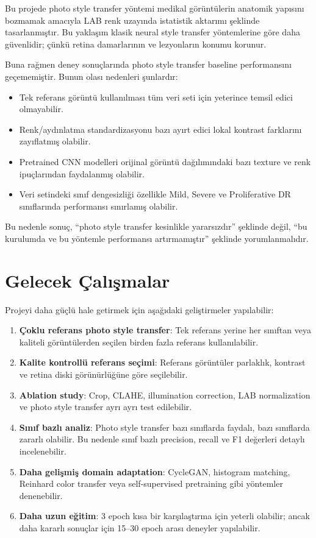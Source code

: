 \documentclass[12pt,a4paper]{article}
\begin{document}
Bu projede photo style transfer yöntemi medikal görüntülerin anatomik yapısını bozmamak amacıyla LAB renk uzayında istatistik aktarımı şeklinde tasarlanmıştır. Bu yaklaşım klasik neural style transfer yöntemlerine göre daha güvenlidir; çünkü retina damarlarının ve lezyonların konumu korunur.

Buna rağmen deney sonuçlarında photo style transfer baseline performansını geçememiştir. Bunun olası nedenleri şunlardır:

\begin{itemize}
    \item Tek referans görüntü kullanılması tüm veri seti için yeterince temsil edici olmayabilir.
    \item Renk/aydınlatma standardizasyonu bazı ayırt edici lokal kontrast farklarını zayıflatmış olabilir.
    \item Pretrained CNN modelleri orijinal görüntü dağılımındaki bazı texture ve renk ipuçlarından faydalanmış olabilir.
    \item Veri setindeki sınıf dengesizliği özellikle Mild, Severe ve Proliferative DR sınıflarında performansı sınırlamış olabilir.
\end{itemize}

Bu nedenle sonuç, ``photo style transfer kesinlikle yararsızdır'' şeklinde değil, ``bu kurulumda ve bu yöntemle performansı artırmamıştır'' şeklinde yorumlanmalıdır.

\section{Gelecek Çalışmalar}

Projeyi daha güçlü hale getirmek için aşağıdaki geliştirmeler yapılabilir:

\begin{enumerate}
    \item \textbf{Çoklu referans photo style transfer}: Tek referans yerine her sınıftan veya kaliteli görüntülerden seçilen birden fazla referans kullanılabilir.
    \item \textbf{Kalite kontrollü referans seçimi}: Referans görüntüler parlaklık, kontrast ve retina diski görünürlüğüne göre seçilebilir.
    \item \textbf{Ablation study}: Crop, CLAHE, illumination correction, LAB normalization ve photo style transfer ayrı ayrı test edilebilir.
    \item \textbf{Sınıf bazlı analiz}: Photo style transfer bazı sınıflarda faydalı, bazı sınıflarda zararlı olabilir. Bu nedenle sınıf bazlı precision, recall ve F1 değerleri detaylı incelenebilir.
    \item \textbf{Daha gelişmiş domain adaptation}: CycleGAN, histogram matching, Reinhard color transfer veya self-supervised pretraining gibi yöntemler denenebilir.
    \item \textbf{Daha uzun eğitim}: 3 epoch kısa bir karşılaştırma için yeterli olabilir; ancak daha kararlı sonuçlar için 15--30 epoch arası deneyler yapılabilir.
\end{enumerate}
\end{document}
